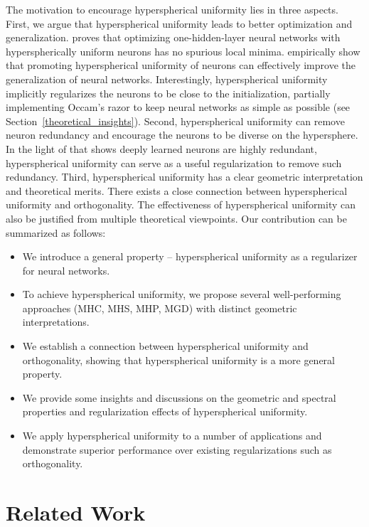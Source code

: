 The motivation to encourage hyperspherical uniformity lies in three aspects. First, we argue that hyperspherical uniformity leads to better optimization and generalization. \cite{xie2016diverse} proves that optimizing one-hidden-layer neural networks with hyperspherically uniform neurons has no spurious local minima. \cite{liu2018learning,Lin20CoMHE} empirically show that promoting hyperspherical uniformity of neurons can effectively improve the generalization of neural networks.  Interestingly, hyperspherical uniformity implicitly regularizes the neurons to be close to the initialization, partially implementing Occam’s razor to keep neural networks as simple as possible (see Section~\ref{theoretical_insights}). Second, hyperspherical uniformity can remove neuron redundancy and encourage the neurons to be diverse on the hypersphere. In the light of \cite{shang2016understanding} that shows deeply learned neurons are highly redundant, hyperspherical uniformity can serve as a useful regularization to remove such redundancy. Third, hyperspherical uniformity has a clear geometric interpretation and theoretical merits. There exists a close connection between hyperspherical uniformity and orthogonality. The effectiveness of hyperspherical uniformity can also be justified from multiple theoretical viewpoints. Our contribution can be summarized as follows:

\begin{itemize}[leftmargin=*]

    \item We introduce a general property -- hyperspherical uniformity as a regularizer for neural networks.
    \item To achieve hyperspherical uniformity, we propose several well-performing approaches (MHC, MHS, MHP, MGD) with distinct geometric interpretations.
    \item We establish a connection between hyperspherical uniformity and orthogonality, showing that hyperspherical uniformity is a more general property.
    \item We provide some insights and discussions on the geometric and spectral properties and regularization effects of hyperspherical uniformity.
    \item We apply hyperspherical uniformity to a number of applications and demonstrate superior performance over existing regularizations such as orthogonality.
\end{itemize}

\section{Related Work}

